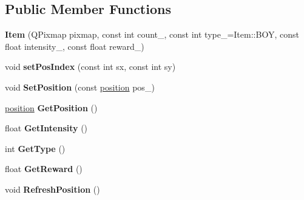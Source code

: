 \subsection*{Public Member Functions}
\begin{DoxyCompactItemize}
\item 
{\bfseries Item} (Q\+Pixmap pixmap, const int count\+\_, const int type\+\_\+=Item\+::\+B\+OY, const float intensity\+\_, const float reward\+\_)\hypertarget{class_item_a8560c460d411e02eaf1c895927d87e2c}{}\label{class_item_a8560c460d411e02eaf1c895927d87e2c}

\item 
void {\bfseries set\+Pos\+Index} (const int sx, const int sy)\hypertarget{class_item_a705067b62641b477184ed230dfe73636}{}\label{class_item_a705067b62641b477184ed230dfe73636}

\item 
void {\bfseries Set\+Position} (const \hyperlink{structposition}{position} pos\+\_\+)\hypertarget{class_item_a8eae93e3528474efa4b3921e9c11b006}{}\label{class_item_a8eae93e3528474efa4b3921e9c11b006}

\item 
\hyperlink{structposition}{position} {\bfseries Get\+Position} ()\hypertarget{class_item_a6d1dcc0c0328d362061bb1a435935348}{}\label{class_item_a6d1dcc0c0328d362061bb1a435935348}

\item 
float {\bfseries Get\+Intensity} ()\hypertarget{class_item_ab1201c61f4120622de9443ca9bbce176}{}\label{class_item_ab1201c61f4120622de9443ca9bbce176}

\item 
int {\bfseries Get\+Type} ()\hypertarget{class_item_aa6867231a1219d677855c79eaeb558e6}{}\label{class_item_aa6867231a1219d677855c79eaeb558e6}

\item 
float {\bfseries Get\+Reward} ()\hypertarget{class_item_a11882ba846bcdd009607f4660afdb59b}{}\label{class_item_a11882ba846bcdd009607f4660afdb59b}

\item 
void {\bfseries Refresh\+Position} ()\hypertarget{class_item_a6afc8b5c805e0fd3655468f3609a4eb1}{}\label{class_item_a6afc8b5c805e0fd3655468f3609a4eb1}

\end{DoxyCompactItemize}
